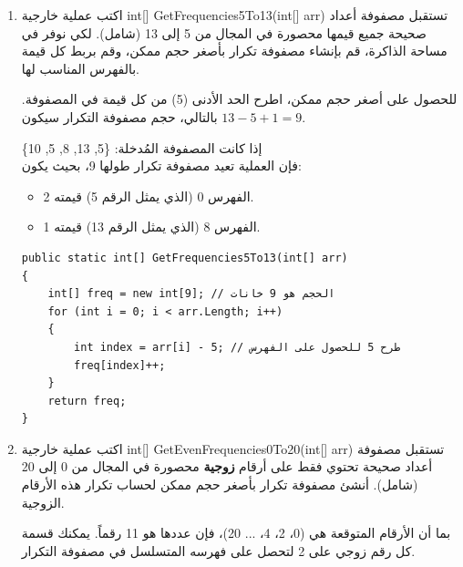 \documentclass[14pt]{extarticle}
\begin{document}
\begin{enumerate}[itemsep=2em]
    \item
    اكتب عملية خارجية \textenglish{int[] GetFrequencies5To13(int[] arr)} تستقبل مصفوفة أعداد صحيحة جميع قيمها محصورة في المجال من 5 إلى 13 (شامل). لكي نوفر في مساحة الذاكرة، قم بإنشاء مصفوفة تكرار بأصغر حجم ممكن، وقم بربط كل قيمة بالفهرس المناسب لها.

    \begin{boxHint}
    للحصول على أصغر حجم ممكن، اطرح الحد الأدنى (5) من كل قيمة في المصفوفة. بالتالي، حجم مصفوفة التكرار سيكون $13 - 5 + 1 = 9$.
    \end{boxHint}

    \begin{boxExample}
    إذا كانت المصفوفة المُدخلة: \textenglish{\{5, 13, 8, 5, 10\}} \\
    فإن العملية تعيد مصفوفة تكرار طولها 9، بحيث يكون:
    \begin{itemize}
        \item الفهرس 0 (الذي يمثل الرقم 5) قيمته 2.
        \item الفهرس 8 (الذي يمثل الرقم 13) قيمته 1.
    \end{itemize}
    \end{boxExample}

    \ifwithsols
    \begin{boxSolution}
    \begin{english}
    \begin{verbatim}
public static int[] GetFrequencies5To13(int[] arr)
{
    int[] freq = new int[9]; // الحجم هو 9 خانات
    for (int i = 0; i < arr.Length; i++)
    {
        int index = arr[i] - 5; // طرح 5 للحصول على الفهرس
        freq[index]++;
    }
    return freq;
}
    \end{verbatim}
    \end{english}
    \end{boxSolution}
    \clearpage
    \fi


    \item
    اكتب عملية خارجية \textenglish{int[] GetEvenFrequencies0To20(int[] arr)} تستقبل مصفوفة أعداد صحيحة تحتوي فقط على أرقام \textbf{زوجية} محصورة في المجال من 0 إلى 20 (شامل). أنشئ مصفوفة تكرار بأصغر حجم ممكن لحساب تكرار هذه الأرقام الزوجية.

    \begin{boxHint}
    بما أن الأرقام المتوقعة هي (0، 2، 4، ... 20)، فإن عددها هو 11 رقماً. يمكنك قسمة كل رقم زوجي على 2 لتحصل على فهرسه المتسلسل في مصفوفة التكرار.
    \end{boxHint}


\end{enumerate}
\end{document}
